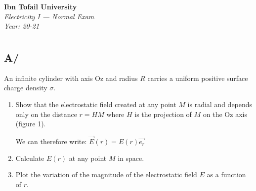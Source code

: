 \documentclass[12pt]{article}
\begin{document}
\begin{center}
  \Large\textbf{Ibn Tofail University} \\[1em]
  \large\textit{Electricity I — Normal Exam} \\[0.5em]
  \large\textit{Year: 20-21} \\[2em]
\end{center}

\vspace{0.5cm}

\section{}
\subsection*{A/} An infinite cylinder with axis Oz and radius $R$ carries a uniform positive surface charge density $\sigma$.

\begin{enumerate}
    \item Show that the electrostatic field created at any point $M$ is radial and depends only on the distance $r = HM$ where $H$ is the projection of $M$ on the Oz axis (figure 1).
    
    We can therefore write:
    $\vec{E}(r) = E(r) \vec{e_r}$
    
    \item Calculate $E(r)$ at any point $M$ in space.
    
    \item Plot the variation of the magnitude of the electrostatic field $E$ as a function of $r$.
\end{enumerate}
\end{document}
